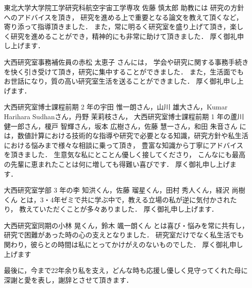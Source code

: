 東北大学大学院工学研究科航空宇宙工学専攻 佐藤 慎太郎 助教には
研究の方針へのアドバイスを頂き，
研究を進める上で重要となる論文を教えて頂くなど，寄り添って指導頂きました．
また，常に明るく研究室を盛り上げて頂き，楽しく研究を進めることができ，精神的にも非常に助けて頂きました．
厚く御礼申し上げます．

大西研究室事務補佐員の赤松 太恵子 さんには，
学会や研究に関する事務手続きを快く引き受けて頂き，研究に集中することができました．
また，生活面でもお世話になり，質の高い研究室生活を送ることができました．
厚く御礼申し上げます．

大西研究室博士課程前期 2 年の宇田 惟一朗さん，山川 雄大さん，Kumar Harihara Sudhanさん，丹野 茉莉枝さん，
大西研究室博士課程前期 1 年の蘆川 健一郎さん，榎戸 智輝さん，坂本 広樹さん，佐藤 慧一さん，和田 朱音さん
には，数値計算における技術的な指導や研究で必要となる知識，研究方針や私生活における悩みまで様々な相談に乗って頂き，
豊富な知識から丁寧にアドバイスを頂きました．
生意気な私にとことん優しく接してくださり，
こんなにも最高の先輩に恵まれたことは何に増しても得難い喜びです．
厚く御礼申し上げます．

大西研究室学部 3 年の李 知洪くん，佐藤 瑠星くん，田村 秀人くん，経沢 尚樹くん
とは，3・4年ゼミで共に学ぶ中で，教える立場の私が逆に気付かされたり，
教えていただくことが多々ありました．
厚く御礼申し上げます．

大西研究室同期の小林 晃くん，鈴木 颯一朗くん
とは喜び・悩みを常に共有し，
研究で困難があった時の心の支えとなりました．
研究室だけでなく私生活でも関わり，彼らとの時間は私にとってかけがえのないものでした．
厚く御礼申し上げます

最後に，今まで22年余り私を支え，どんな時も応援し優しく見守ってくれた母に深謝と愛を表し，謝辞とさせて頂きます．